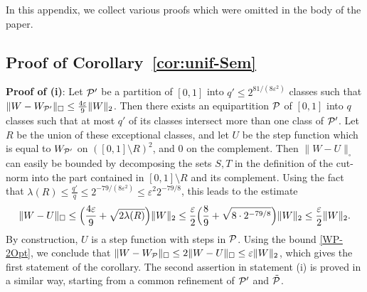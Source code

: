 \documentclass[12pt]{article}
\numberwithin{equation}{section}
\def\eps{\varepsilon}
\def\PP{{\cal P}}\def\QQ{{\cal Q}}\def\RR{{\cal R}}
\begin{document}
In this appendix, we collect various proofs which
were omitted in the body of the paper.





\subsection{Proof of Corollary~\ref{cor:unif-Sem}}

{\bf Proof of (i)}:
Let $\PP'$ be a partition of $[0,1]$ into $q'\leq 2^{81/(8\eps^{2})}$
classes such that $\|W-W_{\PP'}\|_\square\leq \frac {4\eps}9
\|W\|_2$. Then there exists an equipartition $\PP$ of $[0,1]$ into
$q$ classes such that at most $q'$ of its classes intersect more than
one class of $\PP'$. Let $R$ be the union of these exceptional
classes, and let $U$ be the step function which is equal to
$W_{\PP'}$ on $([0,1]\setminus R)^2$, and $0$ on the complement. Then
$\|W-U\|_\square$ can easily be bounded by decomposing the sets $S,T$
in the definition of the cut-norm into the part contained in
$[0,1]\setminus R$ and its complement.  Using the fact that
$\lambda(R)\leq \frac {q'}q\leq 2^{-79/(8\eps^2)}\leq \eps^2
2^{-79/8}$, this leads to the estimate
\[
\|W-U\|_\square\leq \Bigl(\frac {4\eps}9 +
\sqrt{2\lambda(R)}\Bigr) \|W\|_2 \leq
\frac\eps 2 \Bigl(\frac 89 + \sqrt{8\cdot 2^{-79/8}}\Bigr)\|W\|_2
\leq \frac\eps 2 \|W\|_2.
\]
By construction, $U$ is a step function with steps in $\PP$. Using
the bound \eqref{WP-2Opt}, we conclude that $\|W-W_\PP\|_\square\leq
2\|W-U\|_\square\leq\eps\|W\|_2$, which gives the first statement of
the corollary.
The second assertion in statement (i) is proved in a
similar way, starting from a common refinement of $\PP'$ and
$\tilde\PP$.
\end{document}
